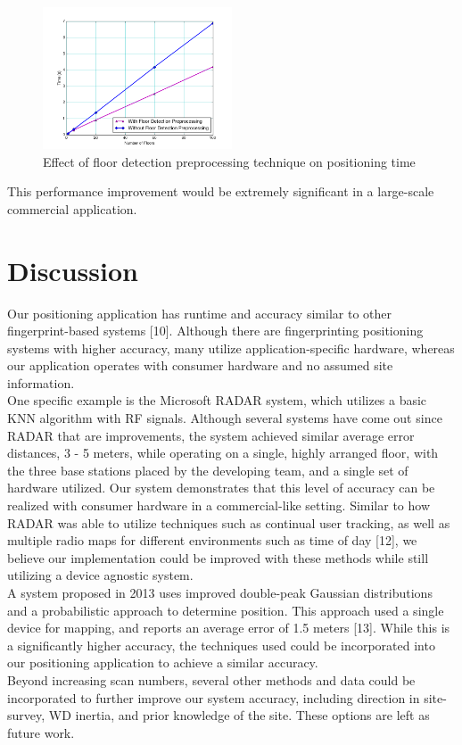 \documentclass[conference]{IEEEtran}
\begin{document}
\begin{figure}[h!]
  \centering
    \includegraphics[width=0.5\textwidth]{time_comparison.png}
   \caption{Effect of floor detection preprocessing technique on positioning time}
\end{figure}

This performance improvement would be extremely significant in a large-scale commercial application.

\section{Discussion}
\indent Our positioning application has runtime and accuracy similar to other fingerprint-based systems [10]. Although there are fingerprinting positioning systems with higher accuracy, many utilize application-specific hardware, whereas our application operates with  consumer hardware and no assumed site information.\\
\indent One specific example is the Microsoft RADAR system, which utilizes a basic KNN algorithm with RF signals. Although several systems have come out since RADAR that are improvements, the system achieved similar average error distances, 3 - 5 meters, while operating on a single, highly arranged floor, with the three base stations placed by the developing team, and a single set of hardware utilized. Our system demonstrates that this level of accuracy can be realized with consumer hardware in a commercial-like setting. Similar to how RADAR was able to utilize techniques such as continual user tracking, as well as multiple radio maps for different environments such as time of day [12], we believe our implementation could be improved with these methods while still utilizing a device agnostic system.\\
\indent A system proposed in 2013 uses improved double-peak Gaussian distributions and a probabilistic approach to determine position. This approach used a single device for mapping, and reports an average error of 1.5 meters [13]. While this is a significantly higher accuracy, the techniques used could be incorporated into our positioning application to achieve a similar accuracy.\\ 
\indent Beyond increasing scan numbers, several other methods and data could be incorporated to further improve our system accuracy, including direction in site-survey, WD inertia, and prior knowledge of the site. These options are left as future work.
\end{document}
